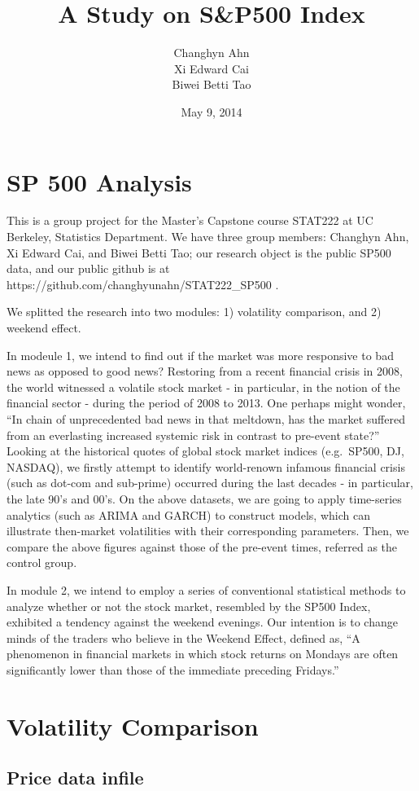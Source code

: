 \documentclass[letterpaper,10pt,english]{/Users/edwsurewin/anaconda/lib/python2.7/site-packages/sphinx/texinputs/sphinxhowto}
\title{A Study on S\&P500 Index}
\date{May 9, 2014}
\author{Changhyn Ahn\\Xi Edward Cai\\Biwei Betti Tao}
\begin{document}
        
            \maketitle
        

        


        
        \section{SP 500 Analysis}\label{sp-500-analysis}

This is a group project for the Master's Capstone course STAT222 at UC
Berkeley, Statistics Department. We have three group members: Changhyn
Ahn, Xi Edward Cai, and Biwei Betti Tao; our research object is the
public SP500 data, and our public github is at
https://github.com/changhyunahn/STAT222\_SP500 .

We splitted the research into two modules: 1) volatility comparison, and
2) weekend effect.

In modeule 1, we intend to find out if the market was more responsive to
bad news as opposed to good news? Restoring from a recent financial
crisis in 2008, the world witnessed a volatile stock market - in
particular, in the notion of the financial sector - during the period of
2008 to 2013. One perhaps might wonder, ``In chain of unprecedented bad
news in that meltdown, has the market suffered from an everlasting
increased systemic risk in contrast to pre-event state?'' Looking at the
historical quotes of global stock market indices (e.g.~SP500, DJ,
NASDAQ), we firstly attempt to identify world-renown infamous financial
crisis (such as dot-com and sub-prime) occurred during the last decades
- in particular, the late 90's and 00's. On the above datasets, we are
going to apply time-series analytics (such as ARIMA and GARCH) to
construct models, which can illustrate then-market volatilities with
their corresponding parameters. Then, we compare the above figures
against those of the pre-event times, referred as the control group.

In module 2, we intend to employ a series of conventional statistical
methods to analyze whether or not the stock market, resembled by the
SP500 Index, exhibited a tendency against the weekend evenings. Our
intention is to change minds of the traders who believe in the Weekend
Effect, defined as, ``A phenomenon in financial markets in which stock
returns on Mondays are often significantly lower than those of the
immediate preceding Fridays.''\section{Volatility Comparison}\label{volatility-comparison}\subsection{Price data infile}\label{price-data-infile}
\end{document}
